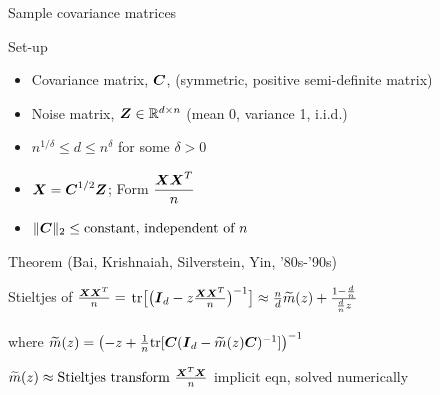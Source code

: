 \documentclass[10pt]{beamer}
\begin{document}
\begin{frame}{Sample covariance matrices}
\begin{exampleblock}{Set-up}
\begin{itemize}
    \item Covariance matrix, ${\boldsymbol C}$, (symmetric, positive semi-definite matrix)
    \item Noise matrix, ${\boldsymbol Z} \in \mathbb{R}^{d \times n}$ (mean 0, variance 1, i.i.d.)
    \item $n^{1/\delta} \le d \le n^{\delta}$ for some $\delta > 0$
    \item ${\boldsymbol X} = {\boldsymbol C}^{1/2} {\boldsymbol Z}$; Form \textcolor{red}{$\displaystyle \frac{{\boldsymbol X}{\boldsymbol X}^T}{n}$}
    \item $\|{\boldsymbol C}\|_2 \le \text{constant, independent of $n$}$
\end{itemize}
\end{exampleblock}

\pause

\begin{alertblock}{Theorem (Bai, Krishnaiah, Silverstein, Yin, '80s-'90s)} %
\begin{center}
    Stieltjes of $\frac{{\boldsymbol X} {\boldsymbol X}^T}{n} = $  $\text{tr} \big [ \big ({\boldsymbol{I}}_d-z \frac{{\boldsymbol X} {\boldsymbol X}^T}{n} \big )^{-1} \big ] \approx \frac{n}{d} \widetilde{m}(z) + \frac{1-\frac{d}{n}}{\frac{d}{n} z}$\\~\\
    where \qquad $\widetilde{m}(z) = \left (-z + \frac{1}{n} \text{tr}[{\boldsymbol C} ({\boldsymbol{I}}_d - \widetilde{m}(z) {\boldsymbol C})^{-1}] \right )^{-1}$
\end{center}

\end{alertblock}
{\footnotesize \checkmark \quad $\widetilde{m}(z) \approx \text{Stieltjes transform $\tfrac{{\boldsymbol X}^T{\boldsymbol X}}{n}$}$ \qquad \checkmark \quad implicit eqn, solved numerically}
\end{frame}
\end{document}
